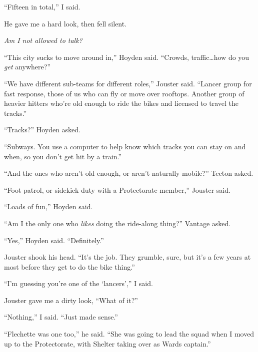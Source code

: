 ``Fifteen in total,'' I said.



He gave me a hard look, then fell silent.



\emph{Am I not allowed to talk?}



``This city sucks to move around in,'' Hoyden said.  ``Crowds, traffic\ldots how do you \emph{get} anywhere?''



``We have different sub-teams for different roles,'' Jouster said.  ``Lancer group for fast response, those of us who can fly or move over rooftops.  Another group of heavier hitters who're old enough to ride the bikes and licensed to travel the tracks.''



``Tracks?''  Hoyden asked.



``Subways.  You use a computer to help know which tracks you can stay on and when, so you don't get hit by a train.''



``And the ones who aren't old enough, or aren't naturally mobile?''  Tecton asked.



``Foot patrol, or sidekick duty with a Protectorate member,'' Jouster said.



``Loads of fun,'' Hoyden said.



``Am I the only one who \emph{likes} doing the ride-along thing?'' Vantage asked.



``Yes,'' Hoyden said.  ``Definitely.''



Jouster shook his head.  ``It's the job.  They grumble, sure, but it's a few years at most before they get to do the bike thing.''



``I'm guessing you're one of the `lancers','' I said.



Jouster gave me a dirty look, ``What of it?''



``Nothing,'' I said.  ``Just made sense.''



``Flechette was one too,'' he said.  ``She was going to lead the squad when I moved up to the Protectorate, with Shelter taking over as Wards captain.''



